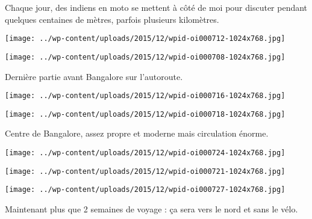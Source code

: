 Chaque jour, des indiens en moto se mettent à côté de moi pour discuter pendant quelques centaines de mètres, parfois plusieurs kilomètres. 
\begin{center} \texttt{[image: ../wp-content/uploads/2015/12/wpid-oi000712-1024x768.jpg]} \end{center}
\begin{center} \texttt{[image: ../wp-content/uploads/2015/12/wpid-oi000708-1024x768.jpg]} \end{center}

Dernière partie avant Bangalore sur l'autoroute. 
\begin{center} \texttt{[image: ../wp-content/uploads/2015/12/wpid-oi000716-1024x768.jpg]} \end{center}
\begin{center} \texttt{[image: ../wp-content/uploads/2015/12/wpid-oi000718-1024x768.jpg]} \end{center}

Centre de Bangalore, assez propre et moderne mais circulation énorme. 
\begin{center} \texttt{[image: ../wp-content/uploads/2015/12/wpid-oi000724-1024x768.jpg]} \end{center}
\begin{center} \texttt{[image: ../wp-content/uploads/2015/12/wpid-oi000721-1024x768.jpg]} \end{center}
\begin{center} \texttt{[image: ../wp-content/uploads/2015/12/wpid-oi000727-1024x768.jpg]} \end{center}

Maintenant plus que 2 semaines de voyage : ça sera vers le nord et sans le vélo.
